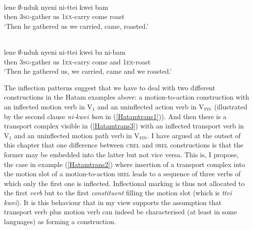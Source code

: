 \ea \label{Hatamtrans2}
\\
\gll lene $\emptyset$-nduk nyeni ni-ttei kwei bam \\ 
then \textsc{3}\textsc{sg}-gather us \textsc{1}\textsc{ex}-carry come roast \\
\glft `Then he gathered us we carried, came, roasted.' \\ 
\z

\ea \label{Hatamtrans3}
\\
\gll lene $\emptyset$-nduk nyeni ni-ttei kwei ba ni-bam \\ 
then \textsc{3}\textsc{sg}-gather us \textsc{1}\textsc{ex}-carry come and \textsc{1}\textsc{ex}-roast \\
\glft `Then he gathered us, we carried, came and we roasted.'\\ 
\z

The inflection patterns suggest that we have to deal with two different constructions in the Hatam examples above: a motion-to-action construction with an inflected motion verb in V$_{1}$ and an uninflected action verb in V$_{\textsc{fin}}$ (illustrated by the second clause \textit{ni-kwei bam} in (\ref{Hatamtrans1})). And then there is a transport complex visible in (\ref{Hatamtrans3}) with an inflected transport verb in V$_{1}$ and an uninflected motion path verb in V$_{\textsc{fin}}$. I have argued at the outset of this chapter that one difference between \textsc{crel} and \textsc{srel} constructions is that the former may be embedded into the latter but not vice versa. This is, I propose, the case in example (\ref{Hatamtrans2}) where insertion of a transport complex into the motion slot of a motion-to-action \textsc{srel} leads to a sequence of three verbs of which only the first one is inflected. Inflectional marking is thus not allocated to the first \emph{verb} but to the first \emph{constituent} filling the motion slot (which is \textit{ttei kwei}). It is this behaviour that in my view supports the assumption that transport verb plus motion verb can indeed be characterised (at least in some languages) as forming a construction.

